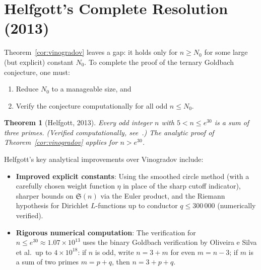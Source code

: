 \documentclass[12pt,a4paper]{amsart}
\newtheorem{theorem}{Theorem}[section]
\theoremstyle{definition}
\begin{document}
\section{Helfgott's Complete Resolution (2013)}
\label{sec:helfgott}

Theorem~\ref{cor:vinogradov} leaves a gap: it holds only for
$n \geq N_0$ for some large (but explicit) constant $N_0$.  To complete
the proof of the ternary Goldbach conjecture, one must:
\begin{enumerate}
  \item Reduce $N_0$ to a manageable size, and
  \item Verify the conjecture computationally for all odd $n \leq N_0$.
\end{enumerate}

\begin{theorem}[Helfgott, 2013]\label{thm:helfgott_full}
  Every odd integer $n$ with $5 < n \leq e^{30}$ is a sum of three primes.
  (Verified computationally, see~\cite{OliveiraSilva2014}.)
  The analytic proof of Theorem~\ref{cor:vinogradov} applies for
  $n > e^{30}$.
\end{theorem}

Helfgott's key analytical improvements over Vinogradov include:
\begin{itemize}
  \item \textbf{Improved explicit constants}: Using the smoothed circle method
    (with a carefully chosen weight function $\eta$ in place of the sharp
    cutoff indicator), sharper bounds on $\mathfrak{S}(n)$ via the Euler
    product, and the Riemann hypothesis for Dirichlet $L$-functions up to
    conductor $q \leq 300\,000$ (numerically verified).
  \item \textbf{Rigorous numerical computation}: The verification for
    $n \leq e^{30} \approx 1.07 \times 10^{13}$ uses the binary Goldbach
    verification by Oliveira e Silva et al.\ up to $4 \times 10^{18}$:
    if $n$ is odd, write $n = 3 + m$ for even $m = n-3$; if $m$ is a sum
    of two primes $m = p + q$, then $n = 3 + p + q$.
\end{itemize}
\end{document}
